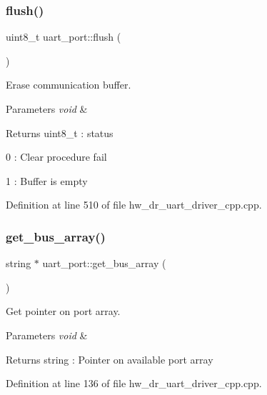 \subsubsection{flush()}
{\footnotesize\ttfamily uint8\+\_\+t uart\+\_\+port\+::flush (\begin{DoxyParamCaption}\item[{void}]{ }\end{DoxyParamCaption})}



Erase communication buffer. 


\begin{DoxyParams}{Parameters}
{\em void} & \\
\hline
\end{DoxyParams}
\begin{DoxyReturn}{Returns}
uint8\+\_\+t \+: status \begin{DoxyItemize}
\item 0 \+: Clear procedure fail \item 1 \+: Buffer is empty \end{DoxyItemize}

\end{DoxyReturn}


Definition at line 510 of file hw\+\_\+dr\+\_\+uart\+\_\+driver\+\_\+cpp.\+cpp.

\mbox{\label{group___u_a_r_t_gae2a1fc2802be9b202d29b81f6822dbd8}} 
\subsubsection{get\_bus\_array()}
{\footnotesize\ttfamily string $\ast$ uart\+\_\+port\+::get\+\_\+bus\+\_\+array (\begin{DoxyParamCaption}\item[{void}]{ }\end{DoxyParamCaption})}



Get pointer on port array. 


\begin{DoxyParams}{Parameters}
{\em void} & \\
\hline
\end{DoxyParams}
\begin{DoxyReturn}{Returns}
string \+: Pointer on available port array 
\end{DoxyReturn}


Definition at line 136 of file hw\+\_\+dr\+\_\+uart\+\_\+driver\+\_\+cpp.\+cpp.

